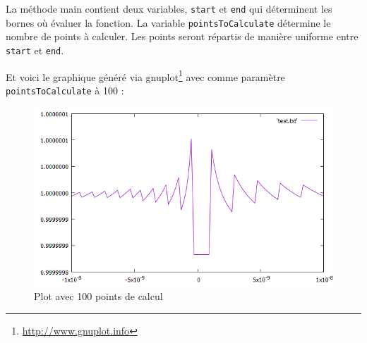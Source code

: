 La méthode main contient deux variables, \texttt{start} et \texttt{end} qui déterminent les bornes où évaluer la fonction. La variable \texttt{pointsToCalculate} détermine le nombre de points à calculer. Les points seront répartis de manière uniforme entre \texttt{start} et \texttt{end}.


Et voici le graphique généré via gnuplot\footnote{\url{http://www.gnuplot.info}} avec comme paramètre \texttt{pointsToCalculate} à 100 :

\begin{figure}[H]
	\caption{\label{ex} Plot avec 100 points de calcul}
	\centering
	\includegraphics[scale = 0.6]{1_plot.png}
\end{figure}
